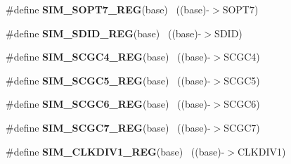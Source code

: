 \begin{DoxyCompactItemize}
\item 
\hypertarget{group___s_i_m___register___accessor___macros_gadd45a86c03d150e9641a354840a71443}{}\#define {\bfseries S\+I\+M\+\_\+\+S\+O\+P\+T7\+\_\+\+R\+E\+G}(base)                                        ~((base)-\/$>$S\+O\+P\+T7)\label{group___s_i_m___register___accessor___macros_gadd45a86c03d150e9641a354840a71443}

\item 
\hypertarget{group___s_i_m___register___accessor___macros_gad1b6e604a7db5ffcbe8c3e16d85c8e6b}{}\#define {\bfseries S\+I\+M\+\_\+\+S\+D\+I\+D\+\_\+\+R\+E\+G}(base)                                          ~((base)-\/$>$S\+D\+I\+D)\label{group___s_i_m___register___accessor___macros_gad1b6e604a7db5ffcbe8c3e16d85c8e6b}

\item 
\hypertarget{group___s_i_m___register___accessor___macros_gab863740854e0a595d5d450e533ded630}{}\#define {\bfseries S\+I\+M\+\_\+\+S\+C\+G\+C4\+\_\+\+R\+E\+G}(base)                                        ~((base)-\/$>$S\+C\+G\+C4)\label{group___s_i_m___register___accessor___macros_gab863740854e0a595d5d450e533ded630}

\item 
\hypertarget{group___s_i_m___register___accessor___macros_gaf51026d4b580eca5948ae938148192e9}{}\#define {\bfseries S\+I\+M\+\_\+\+S\+C\+G\+C5\+\_\+\+R\+E\+G}(base)                                        ~((base)-\/$>$S\+C\+G\+C5)\label{group___s_i_m___register___accessor___macros_gaf51026d4b580eca5948ae938148192e9}

\item 
\hypertarget{group___s_i_m___register___accessor___macros_ga0d700471b59fa17a37db41eea9ac34d4}{}\#define {\bfseries S\+I\+M\+\_\+\+S\+C\+G\+C6\+\_\+\+R\+E\+G}(base)                                        ~((base)-\/$>$S\+C\+G\+C6)\label{group___s_i_m___register___accessor___macros_ga0d700471b59fa17a37db41eea9ac34d4}

\item 
\hypertarget{group___s_i_m___register___accessor___macros_ga8524b7aa144aa516fbbc9ac2da38c7b0}{}\#define {\bfseries S\+I\+M\+\_\+\+S\+C\+G\+C7\+\_\+\+R\+E\+G}(base)                                        ~((base)-\/$>$S\+C\+G\+C7)\label{group___s_i_m___register___accessor___macros_ga8524b7aa144aa516fbbc9ac2da38c7b0}

\item 
\hypertarget{group___s_i_m___register___accessor___macros_ga9a2e39cdabbfa7d094a5442016be4dd0}{}\#define {\bfseries S\+I\+M\+\_\+\+C\+L\+K\+D\+I\+V1\+\_\+\+R\+E\+G}(base)                                    ~((base)-\/$>$C\+L\+K\+D\+I\+V1)\label{group___s_i_m___register___accessor___macros_ga9a2e39cdabbfa7d094a5442016be4dd0}


\end{DoxyCompactItemize}
